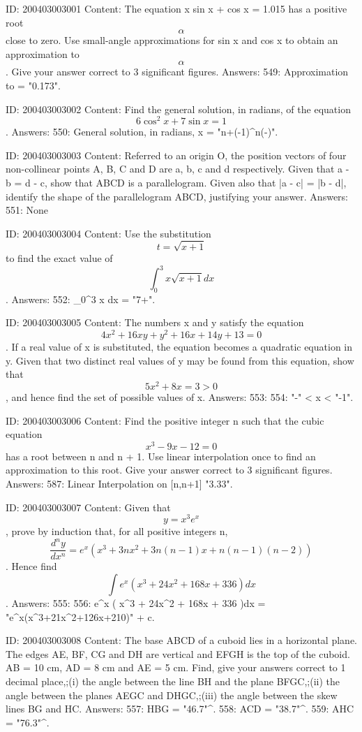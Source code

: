 \documentclass{article}
\begin{document}
ID: 200403003001
Content:
The equation x sin x + cos x = 1.015 has a positive root  $$\alpha $$ close to zero. Use small-angle approximations for sin x and cos x to obtain an approximation to  $$\alpha $$. Give your answer correct to 3 significant figures.  Answers:
549: Approximation to  \alpha  = "0.173".

ID: 200403003002
Content:
Find the general solution, in radians, of the equation  $$6\cos ^2 x + 7\sin x = 1$$. Answers:
550: General solution, in radians,  x = "n\pi +{{(-1)}^{n}}(-\pi)".

ID: 200403003003
Content:
Referred to an origin O, the position vectors of four non-collinear points A, B, C and D are a, b, c and d respectively. Given that a - b = d - c, show that ABCD is a parallelogram. Given also that |a - c| = |b - d|, identify the shape of the parallelogram ABCD, justifying your answer.  Answers:
551: None

ID: 200403003004
Content:
Use the substitution  $$t = \sqrt{x + 1} $$ to find the exact value of  $$\int_0^3 x\sqrt {x + 1}dx $$.  Answers:
552: \int_0^3 x dx = "7+".

ID: 200403003005
Content:
The numbers x and y satisfy the equation  $$4x^2  + 16xy + y^2  + 16x + 14y + 13 = 0$$. If a real value of x is substituted, the equation becomes a quadratic equation in y. Given that two distinct real values of y may be found from this equation, show that  $$5x^2  + 8x = 3 > 0$$, and hence find the set of possible values of x. Answers:
553: 
554: "-" < x < "-1".

ID: 200403003006
Content:
Find the positive integer n such that the cubic equation  $$x^3  - 9x - 12 = 0$$ has a root between n and n + 1. Use linear interpolation once to find an approximation to this root. Give your answer correct to 3 significant figures.  Answers:
587: Linear Interpolation on [n,n+1] \approx "3.33".

ID: 200403003007
Content:
Given that  $$y = x^3 e^x $$, prove by induction that, for all positive integers n,  $$\frac{d^n y}{dx^n}= e^x ( x^3  + 3nx^2  + 3n( n - 1 )x + n( n - 1 )( n - 2 ) )$$. Hence find  $$\int e^x ( x^3  + 24x^2  + 168x + 336 )dx $$. Answers:
555: 
556: \int e^x ( x^3  + 24x^2  + 168x + 336 )dx  = "{{e}^{x}}({{x}^{3}}+21{{x}^{2}}+126x+210)" + c.

ID: 200403003008
Content:
The base ABCD of a cuboid lies in a horizontal plane. The edges AE, BF, CG and DH are vertical and EFGH is the top of the cuboid. AB = 10 cm, AD = 8 cm and AE = 5 cm. Find, give your answers correct to 1 decimal place,;(i) the angle between the line BH and the plane BFGC,;(ii) the angle between the planes AEGC and DHGC,;(iii) the angle between the skew lines BG and HC. Answers:
557: \angle HBG = "46.7"^{\circ}.
558: \angle ACD = "38.7"^{\circ}.
559: \angle AHC = "76.3"^{\circ}.
\end{document}
